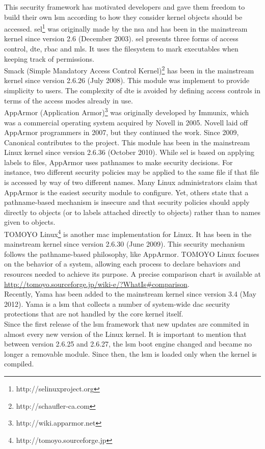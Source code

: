 \noindent
This security framework has motivated developers and gave them freedom to build their own \gls{lsm} according to how they consider kernel objects should be accessed. \gls{sel}\footnote{http://selinuxproject.org} was originally made by the \gls{nsa} and has been in the mainstream kernel since version 2.6 (December 2003). \gls{sel} presents three forms of access control, \gls{dte}, \gls{rbac} and \gls{mls}. It uses the filesystem to mark executables when keeping track of permissions.\\

\noindent
Smack (Simple Mandatory Access Control Kernel)\footnote{http://schaufler-ca.com} has been in the mainstream kernel since version 2.6.26 (July 2008). This module was implement to provide simplicity to users. The complexity of \gls{dte} is avoided by defining access controls in terms of the access modes already in use.\\

\noindent
AppArmor (Application Armor)\footnote{http://wiki.apparmor.net} was originally developed by Immunix, which was a commercial operating system acquired by Novell in 2005. Novell laid off AppArmor programmers in 2007, but they continued the work. Since 2009, Canonical contributes to the project. This module has been in the mainstream Linux kernel since version 2.6.36 (October 2010). While \gls{sel} is based on applying labels to files, AppArmor uses pathnames to make security decisions. For instance, two different security policies may be applied  to the same file if that file is accessed by way of two different names. Many Linux administrators claim that AppArmor is the easiest security module to configure. Yet, others state that a pathname-based mechanism is insecure and that security policies should apply directly to objects (or to labels attached directly to objects) rather than to names given to objects.\\

\noindent
TOMOYO Linux\footnote{http://tomoyo.sourceforge.jp} is another \gls{mac} implementation for Linux. It has been in the mainstream kernel since version 2.6.30 (June 2009). This security mechanism follows the pathname-based philosophy, like AppArmor. TOMOYO Linux focuses on the behavior of a system, allowing each process to declare behaviors and resources needed to achieve its purpose. A precise comparison chart is available at \url{http://tomoyo.sourceforge.jp/wiki-e/?WhatIs#comparison}.\\

\noindent
Recently, Yama has been added to the mainstream kernel since version 3.4 (May 2012). Yama is a \gls{lsm} that collects a number of system-wide \gls{dac}
security protections that are not handled by the core kernel itself.\\

\noindent
Since the first release of the \gls{lsm} framework that new updates are commited in almost every new version of the Linux kernel. It is important to mention that between version 2.6.25 and 2.6.27, the \gls{lsm} boot engine changed and became no longer a removable module. Since then, the \gls{lsm} is loaded only when the kernel is compiled.